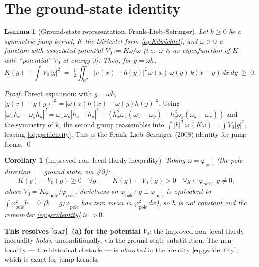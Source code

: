 \documentclass[11pt]{article}
\newcommand{\GAP}{\textcolor{red!75!black}{\textsc{[gap]}}}
\theoremstyle{plain}
\newtheorem{lemma}{Lemma}
\newtheorem{corollary}{Corollary}
\theoremstyle{definition}
\newcommand{\R}{\mathbb{R}}
\newcommand{\kin}{K}
\newcommand{\vv}{V}
\newcommand{\fp}{\varphi_{\mathrm{pole}}}
\begin{document}
\section{The ground-state identity}\label{sec:gsr}

\begin{lemma}[Ground-state representation, Frank--Lieb--Seiringer]
\label{lem:gsr}
Let $k\ge0$ be a symmetric jump kernel, $\kin$ the Dirichlet form
\eqref{eq:Kdirichlet}, and $\omega>0$ a function with associated potential
$\vv_0:=\kin\omega/\omega$ (i.e.\ $\omega$ is an eigenfunction of $\kin$ with ``potential''
$\vv_0$ at energy $0$). Then, for $g=\omega h$,
\begin{equation}\label{eq:gsridentity}
  \kin(g)-\int \vv_0\,|g|^2
  \;=\;\tfrac12\!\iint_{\R^2} |h(x)-h(y)|^2\,\omega(x)\,\omega(y)\,k(x-y)\,dx\,dy
  \;\ge\;0 .
\end{equation}
\end{lemma}
\begin{proof}
Direct expansion: with $g=\omega h$,
$|g(x)-g(y)|^2=|\omega(x)h(x)-\omega(y)h(y)|^2$. Using
$|\omega_x h_x-\omega_y h_y|^2=\omega_x\omega_y|h_x-h_y|^2+(h_x^2\omega_x(\omega_x-\omega_y)+h_y^2\omega_y(\omega_y-\omega_x))$
and the symmetry of $k$, the second group reassembles into
$\int |h|^2\,\omega\,(\kin\omega)=\int\vv_0|g|^2$, leaving \eqref{eq:gsridentity}. This is the
Frank--Lieb--Seiringer (2008) identity for jump forms. \qed
\end{proof}

\begin{corollary}[Improved non--local Hardy inequality]\label{cor:improved}
Taking $\omega=\fp$ (the pole direction $=$ ground state, via \#9):
\[
  \kin(g)-\vv_0(g)\ge0\quad\forall g,\qquad
  \kin(g)-\vv_0(g)>0\quad\forall g\in\fp^\perp,\ g\ne0,
\]
where $\vv_0=\kin\fp/\fp$. Strictness on $\fp^\perp$: $g\perp\fp$ is equivalent to
$\int\fp^2 h=0$ ($h=g/\fp$ has zero mean in $\fp^2\,dx$), so $h$ is not constant and
the remainder \eqref{eq:gsridentity} is $>0$.
\end{corollary}

\noindent\textbf{This resolves \GAP\ (a) for the potential $\vv_0$}: the improved
non--local Hardy inequality \emph{holds}, unconditionally, via the ground-state
substitution. The non--locality --- the historical obstacle --- is \emph{absorbed}
in the identity \eqref{eq:gsridentity}, which is exact for jump kernels.
\end{document}
